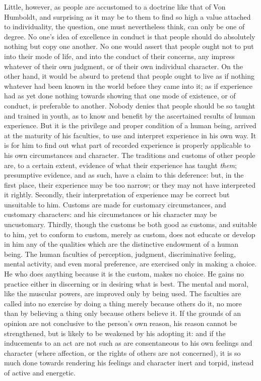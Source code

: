 \documentclass[12pt]{report}
\begin{document}
Little, however, as people are accustomed to a doctrine like that of Von Humboldt, and surprising as it may be to them to find so high a value attached to individuality, the question, one must nevertheless think, can only be one of degree. No one's idea of excellence in conduct is that people should do absolutely nothing but copy one another. No one would assert that people ought not to put into their mode of life, and into the conduct of their concerns, any impress whatever of their own judgment, or of their own individual character. On the other hand, it would be absurd to pretend that people ought to live as if nothing whatever had been known in the world before they came into it; as if experience had as yet done nothing towards showing that one mode of existence, or of conduct, is preferable to another. Nobody denies that people should be so taught and trained in youth, as to know and benefit by the ascertained results of human experience. But it is the privilege and proper condition of a human being, arrived at the maturity of his faculties, to use and interpret experience in his own way. It is for him to find out what part of recorded experience is properly applicable to his own circumstances and character. The traditions and customs of other people are, to a certain extent, evidence of what their experience has taught \emph{them}; presumptive evidence, and as such, have a claim to this deference: but, in the first place, their experience may be too narrow; or they may not have interpreted it rightly. Secondly, their interpretation of experience may be correct but unsuitable to him. Customs are made for customary circumstances, and customary characters: and his circumstances or his character may be uncustomary. Thirdly, though the customs be both good as customs, and suitable to him, yet to conform to custom, merely as custom, does not educate or develop in him any of the qualities which are the distinctive endowment of a human being. The human faculties of perception, judgment, discriminative feeling, mental activity, and even moral preference, are exercised only in making a choice. He who does anything because it is the custom, makes no choice. He gains no practice either in discerning or in desiring what is best. The mental and moral, like the muscular powers, are improved only by being used. The faculties are called into no exercise by doing a thing merely because others do it, no more than by believing a thing only because others believe it. If the grounds of an opinion are not conclusive to the person's own reason, his reason cannot be strengthened, but is likely to be weakened by his adopting it: and if the inducements to an act are not such as are consentaneous to his own feelings and character (where affection, or the rights of others are not concerned), it is so much done towards rendering his feelings and character inert and torpid, instead of active and energetic.
\end{document}
